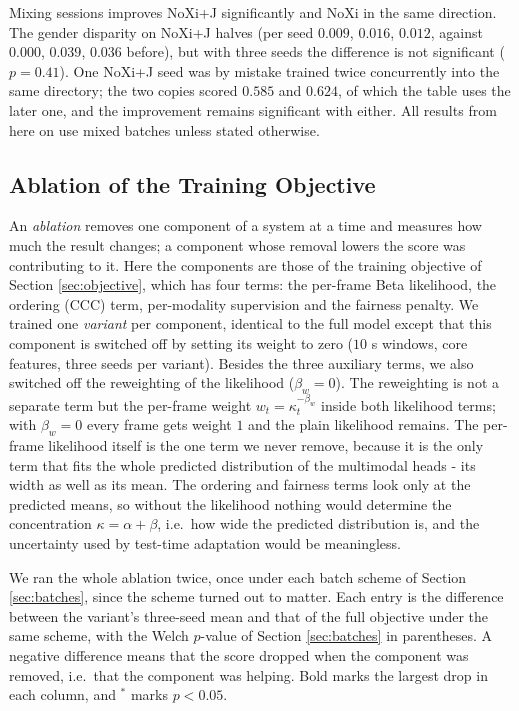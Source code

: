 \documentclass[10pt,a4paper,twocolumn]{article}
\begin{document}
	Mixing sessions improves NoXi+J significantly and NoXi in the same direction. The gender disparity on NoXi+J halves (per seed $0.009$, $0.016$, $0.012$, against $0.000$, $0.039$, $0.036$ before), but with three seeds the difference is not significant ($p = 0.41$). One NoXi+J seed was by mistake trained twice concurrently into the same directory; the two copies scored $0.585$ and $0.624$, of which the table uses the later one, and the improvement remains significant with either. All results from here on use mixed batches unless stated otherwise.

	\subsection*{Ablation of the Training Objective}
	An \emph{ablation} removes one component of a system at a time and measures how much the result changes; a component whose removal lowers the score was contributing to it. Here the components are those of the training objective of Section \ref{sec:objective}, which has four terms: the per-frame Beta likelihood, the ordering (CCC) term, per-modality supervision and the fairness penalty. We trained one \emph{variant} per component, identical to the full model except that this component is switched off by setting its weight to zero ($10$ s windows, core features, three seeds per variant). Besides the three auxiliary terms, we also switched off the reweighting of the likelihood ($\beta_w = 0$). The reweighting is not a separate term but the per-frame weight $w_t = \kappa_t^{-\beta_w}$ inside both likelihood terms; with $\beta_w = 0$ every frame gets weight $1$ and the plain likelihood remains. The per-frame likelihood itself is the one term we never remove, because it is the only term that fits the whole predicted distribution of the multimodal heads - its width as well as its mean. The ordering and fairness terms look only at the predicted means, so without the likelihood nothing would determine the concentration $\kappa = \alpha + \beta$, i.e.\ how wide the predicted distribution is, and the uncertainty used by test-time adaptation would be meaningless.

	We ran the whole ablation twice, once under each batch scheme of Section \ref{sec:batches}, since the scheme turned out to matter. Each entry is the difference between the variant's three-seed mean and that of the full objective under the same scheme, with the Welch $p$-value of Section \ref{sec:batches} in parentheses. A negative difference means that the score dropped when the component was removed, i.e.\ that the component was helping. Bold marks the largest drop in each column, and $^{*}$ marks $p < 0.05$.
\end{document}
